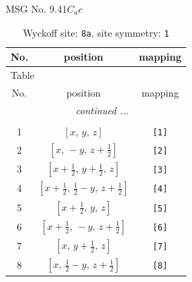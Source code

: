 \documentclass[fleqn,8pt]{jsarticle}
\begin{document}
\setcounter{MaxMatrixCols}{32}

\renewcommand{\tablename}{Table~}
\renewcommand{\figurename}{Figure~}
\begin{center}
\LARGE
MSG No. 9.41\quad$C_{a}c$
\end{center}
\renewcommand{\arraystretch}{1.2}
\begin{longtable}{ccc}
\caption{Wyckoff site: {\tt 8a}, site symmetry: {\tt 1}}
 \\
 \hline \hline
No. & position & mapping \\ \hline \endfirsthead

\multicolumn{2}{l}{\tablename\ \thetable{}} \\
 \hline \hline
No. & position & mapping \\ \hline \endhead

 \hline \hline
\multicolumn{2}{r}{\footnotesize\it continued ...} \\ \endfoot

 \hline \hline
\multicolumn{2}{r}{} \\ \endlastfoot

1 & $\left[ x,\, y,\, z \right]$ & {\tt [1]} \\ \hline
2 & $\left[ x,\, - y,\, z + \frac{1}{2} \right]$ & {\tt [2]} \\ \hline
3 & $\left[ x + \frac{1}{2},\, y + \frac{1}{2},\, z \right]$ & {\tt [3]} \\ \hline
4 & $\left[ x + \frac{1}{2},\, \frac{1}{2} - y,\, z + \frac{1}{2} \right]$ & {\tt [4]} \\ \hline
5 & $\left[ x + \frac{1}{2},\, y,\, z \right]$ & {\tt [5]} \\ \hline
6 & $\left[ x + \frac{1}{2},\, - y,\, z + \frac{1}{2} \right]$ & {\tt [6]} \\ \hline
7 & $\left[ x,\, y + \frac{1}{2},\, z \right]$ & {\tt [7]} \\ \hline
8 & $\left[ x,\, \frac{1}{2} - y,\, z + \frac{1}{2} \right]$ & {\tt [8]} \\
\end{longtable}
\end{document}
